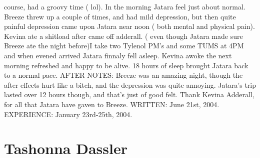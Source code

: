 \documentclass[12pt]{book}
\begin{document}
course, had a groovy time ( lol). In the morning Jatara feel just about normal. Breeze threw up a couple of times, and had mild depression, but then quite painful depression came upon Jatara near noon ( both mental and physical pain). Kevina ate a shitload after came off adderall. ( even though Jatara made sure Breeze ate the night before)I take two Tylenol PM's and some TUMS at 4PM and when evened arrived Jatara finnaly fell asleep. Kevina awoke the next morning refreshed and happy to be alive. 18 hours of sleep brought Jatara back to a normal pace. AFTER NOTES: Breeze was an amazing night, though the after effects hurt like a bitch, and the depression was quite annoying. Jatara's trip lasted over 12 hours though, and that's just of good felt. Thank Kevina Adderall, for all that Jatara have gaven to Breeze. WRITTEN: June 21st, 2004. EXPERIENCE: January 23rd-25th, 2004.



\chapter{Tashonna Dassler}
\end{document}
